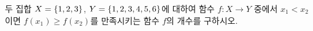 두 집합 $X=\{1{,}\mkern3mu\mathopen{}2{,}\mkern3mu\mathopen{}3\}$, $Y=\{1{,}\mkern3mu\mathopen{}2{,}\mkern3mu\mathopen{}3{,}\mkern3mu\mathopen{}4{,}\mkern3mu\mathopen{}5{,}\mkern3mu\mathopen{}6\}$에 대하여 함수 $f:X\longrightarrow Y$ 중에서 $x_1<x_2$이면 $f(x_1)\ge f(x_2)$를 만족시키는 함수 $f$의 개수를 구하시오. 
